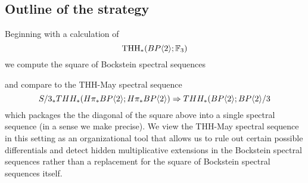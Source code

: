 \subsection{Outline of the strategy}
Beginning with a calculation of
\[\operatorname{THH}_*(BP\langle 2 \rangle;\mathbb{F}_3)\] 
we compute the square of Bockstein spectral sequences
\begin{center}
\end{center}
and compare to the THH-May spectral sequence 
\[S/3_*THH_*(H\pi_*BP\langle 2 \rangle;H\pi_*BP\langle 2 \rangle)\Rightarrow THH_*(BP\langle 2 \rangle;BP\langle 2 \rangle/3\]
which packages the the diagonal of the square above into a single spectral sequence (in a sense we make precise). We view the THH-May spectral sequence in this setting as an organizational tool that allows us to rule out certain possible differentials and detect hidden multiplicative extensions in the Bockstein spectral sequences rather than a replacement for the square of Bockstein spectral sequences itself. 


\begin{comment}
Working from our calculation of $\THH(\B;\F_3)$ we will analyze the cube of Bockstein spectral sequences corresponding to the diagram
\begin{equation}\label{cube}
\xymatrix{ 
H\F_p  \ar@{-}[rd] \ar@{-}[dd] \ar@{-}[rr] & & H\Z_{(p)} \ar@{-}[rd] \ar@{-}[dd] & \\
 & k(1)  \ar@{-}[dd] \ar@{-}[rr] & & \tBP{1} \ar@{-}[dd]  \\
k(2)   \ar@{-}[dr] \ar@{-}[rr] & &\B/v_1  \ar@{-}[dr] & \\
 & \B/p \ar@{-}[rr] & & \B  } .   
 \end{equation}
 \end{comment}
 
